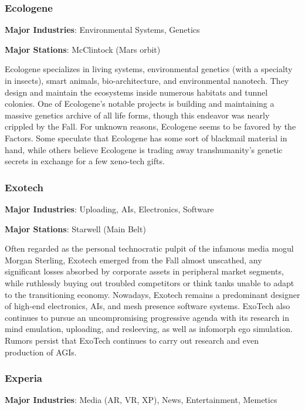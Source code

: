 \subsubsection{Ecologene}
\label{sec:ecologene}

\textbf{Major Industries}: Environmental Systems, Genetics

\textbf{Major Stations}: McClintock (Mars orbit)


Ecologene specializes in living systems, environmental genetics (with
a specialty in insects), smart animals, bio-architecture, and
environmental nanotech. They design and maintain the ecosystems inside
numerous habitats and tunnel colonies. One of Ecologene's notable
projects is building and maintaining a massive genetics archive of all
life forms, though this endeavor was nearly crippled by the Fall. For
unknown reasons, Ecologene seems to be favored by the Factors. Some
speculate that Ecologene has some sort of blackmail material in hand,
while others believe Ecologene is trading away transhumanity's genetic
secrets in exchange for a few xeno-tech gifts.

\subsubsection{Exotech}
\label{sec:exotech}

\textbf{Major Industries}: Uploading, AIs, Electronics, Software

\textbf{Major Stations}: Starwell (Main Belt)


Often regarded as the personal technocratic pulpit of the infamous
media mogul Morgan Sterling, Exotech emerged from the Fall almost
unscathed, any significant losses absorbed by corporate assets in
peripheral market segments, while ruthlessly buying out troubled
competitors or think tanks unable to adapt to the transitioning
economy. Nowadays, Exotech remains a predominant designer of high-end
electronics, AIs, and mesh presence software systems. ExoTech also
continues to pursue an uncompromising progressive agenda with its
research in mind emulation, uploading, and resleeving, as well as
infomorph ego simulation.  Rumors persist that ExoTech continues to
carry out research and even production of AGIs.

\subsubsection{Experia}
\label{sec:experia}

\textbf{Major Industries}: Media (AR, VR, XP), News, Entertainment, Memetics

